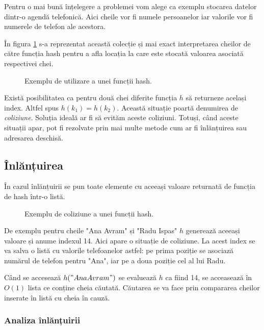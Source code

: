 Pentru o mai bună înțelegere a problemei vom alege ca exemplu stocarea datelor dintr-o agendă telefonică. Aici cheile vor fi numele persoanelor iar valorile vor fi numerele de telefon ale acestora.

În figura \ref{fig:hashfunction} s-a reprezentat această colecție și mai exact interpretarea cheilor de către funcția hash pentru a afla locația la care este stocată valoarea asociată respectivei chei.

\begin{figure}[H] 
	\centering	
	{
	}
	\caption{Exemplu de utilizare a unei funcții hash.} 
	\label{fig:hashfunction}
\end{figure}

Există posibilitatea ca pentru două chei diferite funcția $h$ să returneze același index. Altfel spus $h(k_{1})=h(k_{2})$. Această situație poartă denumirea de \textit{coliziune}. Soluția ideală ar fi să evităm aceste coliziuni. Totuși, când aceste situații apar, pot fi rezolvate prin mai multe metode cum ar fi înlănțuirea sau adresarea deschisă.

\subsection{Înlănțuirea}

În cazul înlănțuirii se pun toate elemente cu aceeași valoare returnată de funcția de hash într-o listă. 

\begin{figure}[H] 
	\centering	
	{
	}
	\caption{Exemplu de coliziune a unei funcții hash.} 
	\label{fig:hashcolision}
\end{figure}

De exemplu pentru cheile "Ana Avram" și "Radu Ispas" $h$ generează aceeași valoare și anume indexul 14. Aici apare o situație de coliziune.
La acest index se va salva o listă cu valorile telefoanelor astfel: pe prima poziție se asociază numărul de telefon pentru "Ana", iar pe a doua poziție cel al lui Radu.

Când se accesează $h("Ana Avram")$ se evaluează $h$ ca fiind 14, se acceasează în $O(1)$ lista ce conține cheia căutată. Căutarea se va face prin compararea cheilor inserate în listă cu cheia în cauză. 

\subsubsection{Analiza înlănțuirii}

